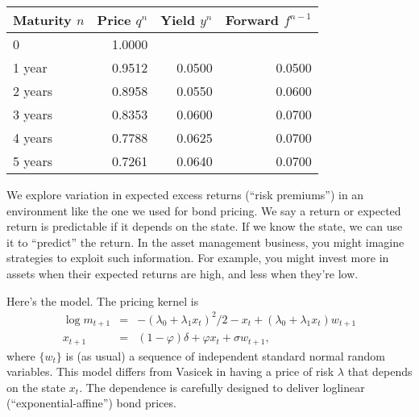 \documentclass[11pt]{exam}
\begin{document}
\begin{questions}
\begin{solution}
\begin{center}
\tabcolsep=0.1in
\begin{tabular}{lrrr}
\toprule
Maturity $n$   & \phantom{xx} Price $q^n$ & \phantom{xx} Yield $y^n$ & Forward $f^{n-1}$ \\
\midrule
0           &    1.0000  \\
1 year      &    0.9512  & 0.0500 & 0.0500 \\
2 years     &    0.8958  & 0.0550 & 0.0600 \\
3 years     &    0.8353  & 0.0600 & 0.0700 \\
4 years     &    0.7788  & 0.0625 & 0.0700 \\
5 years     &    0.7261  & 0.0640 & 0.0700 \\
\bottomrule
\end{tabular}
\end{center}
\medskip

\end{solution}


We explore variation in expected excess returns
(``risk premiums'') in an environment like the one we used for bond pricing.
We say a return or expected return is predictable if it depends on
the state.
If we know the state, we can use it to ``predict'' the return.
In the asset management business, you might imagine strategies to exploit such
information.
For example, you might invest more in assets when their expected returns are high,
and less when they're low.

Here's the model.  The pricing kernel is
\begin{eqnarray*}
    \log m_{t+1} &=& - (\lambda_0 + \lambda_1 x_t)^2/2 - x_t
                + (\lambda_0 + \lambda_1 x_t) w_{t+1} \\
        x_{t+1} &=& (1-\varphi) \delta + \varphi x_t + \sigma w_{t+1} ,
\end{eqnarray*}
where $\{ w_t \}$ is (as usual) a sequence of independent standard normal random variables.
This model differs from Vasicek in having a price of risk $\lambda$ that
depends on the state $x_t$.
The dependence is carefully designed to deliver loglinear (``exponential-affine'')
bond prices.


\end{questions}
\end{document}
